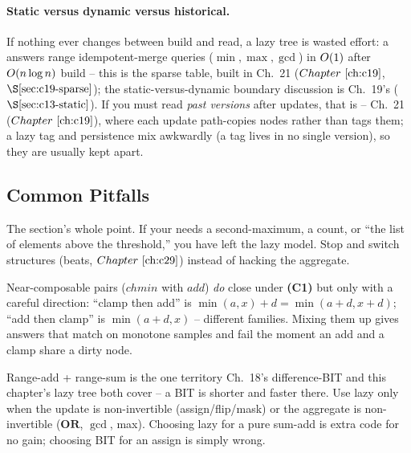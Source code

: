 \paragraph{Static versus dynamic versus historical.}
If nothing ever changes between build and read, a lazy tree is wasted effort: a  answers range idempotent-merge queries (\(\min,\max,\gcd\)) in \(O(1)\) after \(O(n\log n)\) build -- this is the sparse table, built in Ch.~21 (\(\chref{c19}\), \(\secref{c19-sparse}\)); the static-versus-dynamic boundary discussion is Ch.~19's (\(\secref{c13-static}\)).  If you must read \emph{past versions} after updates, that is  -- Ch.~21 (\(\chref{c19}\)), where each update path-copies nodes rather than tags them; a lazy tag and persistence mix awkwardly (a tag lives in no single version), so they are usually kept apart.

\subsection{Common Pitfalls}

\begin{warningbox}
The section's whole point.  If your  needs a second-maximum, a count, or ``the list of elements above the threshold,'' you have left the lazy model.  Stop and switch structures (beats, \(\chref{c29}\)) instead of hacking the aggregate.
\end{warningbox}

\begin{warningbox}
Near-composable pairs (\(\mathit{chmin}\) with \(\mathit{add}\)) \emph{do} close under \textbf{(C1)} but only with a careful direction: ``clamp then add'' is \(\min(a,x)+d=\min(a+d,x+d)\); ``add then clamp'' is \(\min(a+d,x)\) -- different families.  Mixing them up gives answers that match on monotone samples and fail the moment an add and a clamp share a dirty node.
\end{warningbox}

\begin{warningbox}
Range-add + range-sum is the one territory Ch.~18's difference-BIT and this chapter's lazy tree both cover -- a BIT is shorter and faster there.  Use lazy only when the update is non-invertible (assign/flip/mask) or the aggregate is non-invertible (\(\mathbf{OR}\), \(\gcd\), max).  Choosing lazy for a pure sum-add is extra code for no gain; choosing BIT for an assign is simply wrong.
\end{warningbox}

